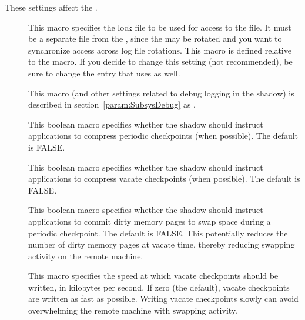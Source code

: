 These settings affect the .
\begin{description}

\item[] \label{param:ShadowLock} This macro
  specifies the lock file to be used for access to the
   file.  It must be a separate file from the
  , since the  may be rotated 
  and you want to synchronize access across log file rotations.
  This macro is defined relative to the  macro.
  If you decide to change this setting (not recommended),
  be sure to change the  entry that
   uses as well.

\item[] \label{param:ShadowDebug} This macro
  (and other settings related to debug logging in the shadow) is
  described in section~\ref{param:SubsysDebug} as
  .

\item[]
  \label{param:CompressPeriodicCkpt} This boolean macro specifies
  whether the shadow should instruct applications to compress periodic
  checkpoints (when possible).  The default is FALSE.

\item[]
  \label{param:CompressVacateCkpt} This boolean macro specifies
  whether the shadow should instruct applications to compress vacate
  checkpoints (when possible).  The default is FALSE.

\item[] \label{param:PeriodicMemorySync}
  This boolean macro specifies whether the shadow should instruct
  applications to commit dirty memory pages to swap space during a
  periodic checkpoint.  The default is FALSE.  This potentially
  reduces the number of dirty memory pages at vacate time, thereby
  reducing swapping activity on the remote machine.

\item[] \label{param:SlowCkptSpeed}  This
  macro specifies the speed at which vacate checkpoints should be
  written, in kilobytes per second.  If zero (the default), vacate
  checkpoints are written as fast as possible.  Writing vacate
  checkpoints slowly can avoid overwhelming the remote machine with
  swapping activity.

\end{description}

